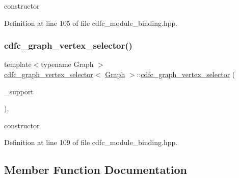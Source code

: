 constructor 



Definition at line 105 of file cdfc\+\_\+module\+\_\+binding.\+hpp.

\mbox{\label{structcdfc__graph__vertex__selector_a03c0a5d73a3c817560b9bb13632a87fd}} 
\subsubsection{\texorpdfstring{cdfc\+\_\+graph\+\_\+vertex\+\_\+selector()}{cdfc\_graph\_vertex\_selector()}\hspace{0.1cm}{\footnotesize\ttfamily [2/2]}}
{\footnotesize\ttfamily template$<$typename Graph $>$ \\
\hyperlink{structcdfc__graph__vertex__selector}{cdfc\+\_\+graph\+\_\+vertex\+\_\+selector}$<$ \hyperlink{structGraph}{Graph} $>$\+::\hyperlink{structcdfc__graph__vertex__selector}{cdfc\+\_\+graph\+\_\+vertex\+\_\+selector} (\begin{DoxyParamCaption}\item[{const \hyperlink{structcdfc__graph__vertex__selector_a4eabaf16609aadaa7ed6bcb236d82950}{S\+E\+T\+\_\+container} $\ast$}]{\+\_\+support }\end{DoxyParamCaption})\hspace{0.3cm}{\ttfamily [inline]}, {\ttfamily [explicit]}}



constructor 



Definition at line 109 of file cdfc\+\_\+module\+\_\+binding.\+hpp.



\subsection{Member Function Documentation}
\mbox{\label{structcdfc__graph__vertex__selector_aeef42f80e4940392424ec72adf57c1c8}} 
